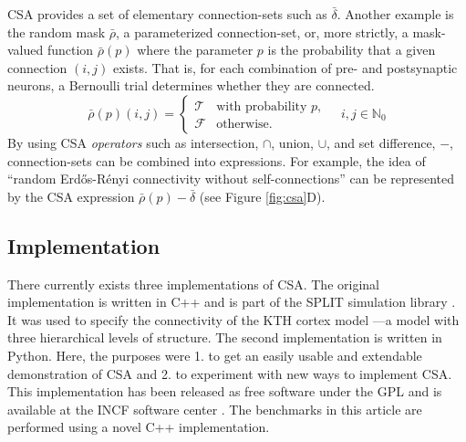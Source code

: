 \documentclass{frontiersSCNS} %
\begin{document}
CSA provides a set of elementary connection-sets such as
$\bar{\delta}$. Another example is the random mask $\bar{\rho}$, a
parameterized connection-set, or, more strictly, a mask-valued
function $\bar{\rho}(p)$ where the parameter $p$ is the probability
that a given connection $(i, j)$ exists.  That is, for each
combination of pre- and postsynaptic neurons, a Bernoulli trial
determines whether they are connected.
\begin{equation}
  \bar{\rho} (p) (i, j) =
  \begin{cases}
    \mathcal{T}& \text{with probability $p$},\\
    \mathcal{F}& \text{otherwise}.
  \end{cases}
  \quad i, j \in \mathbb{N}_0
\end{equation}
By using CSA \emph{operators} such as intersection, $\cap$, union,
$\cup$, and set difference, $-$, connection-sets can be combined into
expressions. For example, the idea of ``random Erd\H{o}s-R\'enyi
connectivity without self-connections'' can be represented by the CSA
expression $\bar{\rho}(p) - \bar{\delta}$ (see Figure
\ref{fig:csa}D).

\subsection{Implementation}\label{sec:impl}

There currently exists three implementations of CSA.  The original
implementation is written in C++ and is part of the SPLIT simulation
library \citep{djurfeldt05}.  It was used to specify the connectivity
of the KTH cortex model \citep{djurfeldt08}---a model with three
hierarchical levels of structure.  The second implementation is
written in Python.  Here, the purposes were 1. to get an easily usable
and extendable demonstration of CSA and 2. to experiment with new ways
to implement CSA. This implementation has been released as free
software under the GPL and is available at the INCF software center
\citep{djurfeldt10}.  The benchmarks in this article are performed
using a novel C++ implementation.
\end{document}
